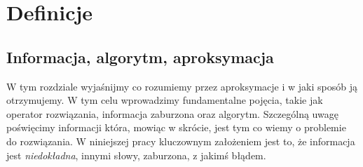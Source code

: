 \documentclass[oik, pdftex, robocza, man]{mgrwms}
\begin{document}
\begin{wstep}[Wprowadzenie]



\end{wstep}


\chapter{Definicje}


\section{Informacja, algorytm, aproksymacja}


    W tym rozdziale wyjaśnijmy co rozumiemy przez aproksymacje i w jaki sposób ją otrzymujemy. W tym celu wprowadzimy fundamentalne pojęcia, takie jak operator rozwiązania, informacja zaburzona oraz algorytm. Szczególną uwagę poświęcimy informacji która, mowiąc w skrócie, jest tym co wiemy o problemie do rozwiązania. W niniejszej pracy kluczownym założeniem jest to, że informacja jest \textit{niedokładna}, innymi słowy, zaburzona, z jakimś błądem.
\end{document}
